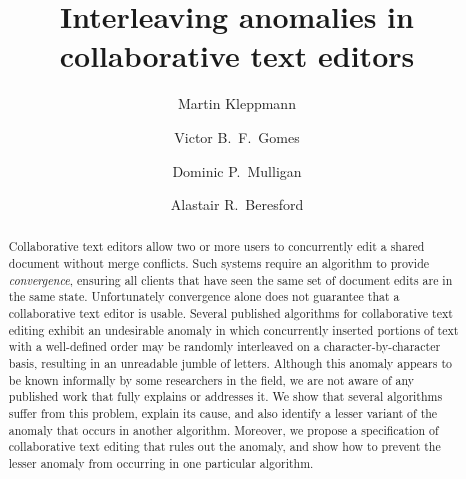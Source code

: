\documentclass[sigconf]{acmart}
\begin{document}
\title{Interleaving anomalies in collaborative text editors}

\author{Martin Kleppmann}

\author{Victor B.\ F.\ Gomes}

\author{Dominic P.\ Mulligan}

\author{Alastair R.\ Beresford}

\begin{abstract}
Collaborative text editors allow two or more users to concurrently edit a shared document without merge conflicts.
Such systems require an algorithm to provide \emph{convergence}, ensuring all clients that have seen the same set of document edits are in the same state.
Unfortunately convergence alone does not guarantee that a collaborative text editor is usable.
Several published algorithms for collaborative text editing exhibit an undesirable anomaly in which concurrently inserted portions of text with a well-defined order may be randomly interleaved on a character-by-character basis, resulting in an unreadable jumble of letters.
Although this anomaly appears to be known informally by some researchers in the field, we are not aware of any published work that fully explains or addresses it.
We show that several algorithms suffer from this problem, explain its cause, and also identify a lesser variant of the anomaly that occurs in another algorithm.
Moreover, we propose a specification of collaborative text editing that rules out the anomaly, and show how to prevent the lesser anomaly from occurring in one particular algorithm.
\end{abstract}
\end{document}
